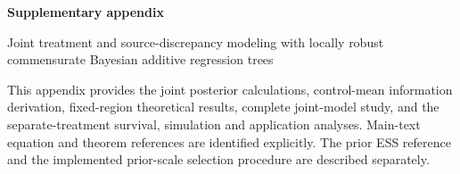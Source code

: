 \documentclass[11pt]{article}
\begin{document}
\begin{center}
{\Large\bfseries Supplementary appendix}\par\medskip
{Joint treatment and source-discrepancy modeling with locally robust commensurate Bayesian additive regression trees}\par
{}
\end{center}
\noindent This appendix provides the joint posterior calculations, control-mean information derivation, fixed-region theoretical results, complete joint-model study, and the separate-treatment survival, simulation and application analyses. Main-text equation and theorem references are identified explicitly. The prior ESS reference and the implemented prior-scale selection procedure are described separately.
\tableofcontents
\clearpage
\appendix
{}






\clearpage

\clearpage



\end{document}
